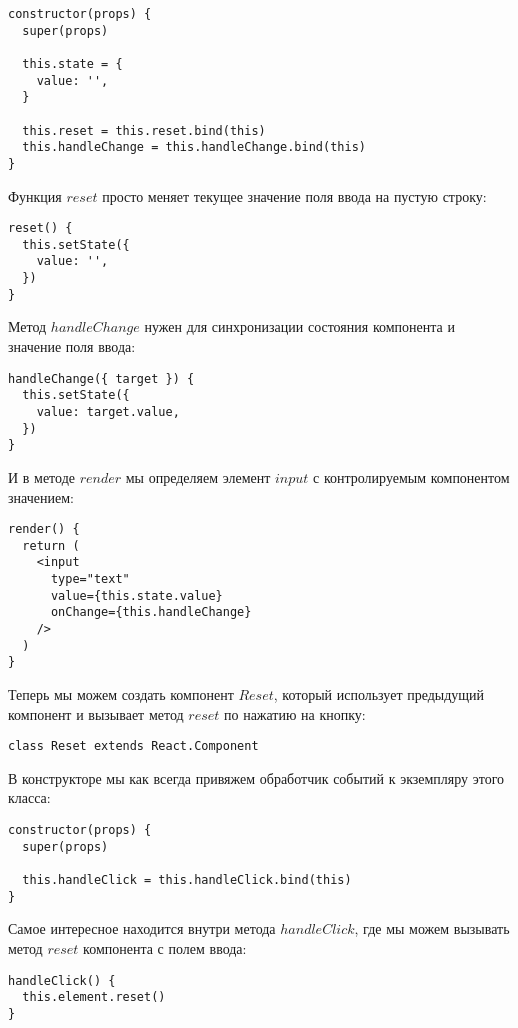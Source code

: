 \begin{lstlisting}
constructor(props) {
  super(props)
  
  this.state = {
    value: '',
  }
  
  this.reset = this.reset.bind(this)
  this.handleChange = this.handleChange.bind(this)
}
\end{lstlisting}

Функция $reset$ просто меняет текущее значение поля ввода на пустую строку:

\begin{lstlisting}
reset() {
  this.setState({
    value: '', 
  })
}
\end{lstlisting}

Метод $handleChange$ нужен для синхронизации состояния компонента и значение поля ввода:

\begin{lstlisting}
handleChange({ target }) {
  this.setState({
    value: target.value,
  })
}
\end{lstlisting}

И в методе $render$ мы определяем элемент $input$ с контролируемым компонентом значением:

\begin{lstlisting}
render() {
  return (
    <input
      type="text"
      value={this.state.value}
      onChange={this.handleChange}
    /> 
  )
}
\end{lstlisting}

Теперь мы можем создать компонент $Reset$, который использует предыдущий компонент и вызывает метод $reset$ по нажатию на кнопку:

\begin{lstlisting}
class Reset extends React.Component
\end{lstlisting}

В конструкторе мы как всегда привяжем обработчик событий к экземпляру этого класса:

\begin{lstlisting}
constructor(props) {
  super(props)
  
  this.handleClick = this.handleClick.bind(this)
}
\end{lstlisting}

Самое интересное находится внутри метода $handleClick$, где мы можем вызывать метод $reset$ компонента с полем ввода:

\begin{lstlisting}
handleClick() {
  this.element.reset()
}
\end{lstlisting}

